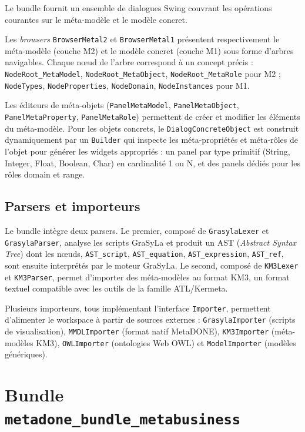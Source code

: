 Le bundle fournit un ensemble de dialogues Swing couvrant les opérations courantes sur le méta-modèle et le modèle concret.

Les \emph{browsers} \texttt{BrowserMetal2} et \texttt{BrowserMetal1} présentent respectivement le méta-modèle (couche M2) et le modèle concret (couche M1) sous forme d'arbres navigables. Chaque nœud de l'arbre correspond à un concept précis : \texttt{NodeRoot\_MetaModel}, \texttt{NodeRoot\_MetaObject}, \texttt{NodeRoot\_MetaRole} pour M2 ; \texttt{NodeTypes}, \texttt{NodeProperties}, \texttt{NodeDomain}, \texttt{NodeInstances} pour M1.

Les éditeurs de méta-objets (\texttt{PanelMetaModel}, \texttt{PanelMetaObject}, \texttt{PanelMetaProperty}, \texttt{PanelMetaRole}) permettent de créer et modifier les éléments du méta-modèle. Pour les objets concrets, le \texttt{DialogConcreteObject} est construit dynamiquement par un \texttt{Builder} qui inspecte les méta-propriétés et méta-rôles de l'objet pour générer les widgets appropriés : un panel par type primitif (String, Integer, Float, Boolean, Char) en cardinalité 1 ou N, et des panels dédiés pour les rôles domain et range.

\subsection{Parsers et importeurs}

Le bundle intègre deux parsers. Le premier, composé de
\texttt{GrasylaLexer} et \texttt{GrasylaParser}, analyse les scripts GraSyLa et produit un AST (\emph{Abstract Syntax Tree}) dont les nœuds, \texttt{AST\_script}, \texttt{AST\_equation}, \texttt{AST\_expression},
\texttt{AST\_ref}, sont ensuite interprétés par le moteur GraSyLa. Le second, composé de \texttt{KM3Lexer} et \texttt{KM3Parser}, permet d'importer des méta-modèles au format KM3, un format textuel compatible avec les outils de la famille ATL/Kermeta.

Plusieurs importeurs, tous implémentant l'interface \texttt{Importer}, permettent d'alimenter le workspace à partir de sources externes : \texttt{GrasylaImporter} (scripts de visualisation), \texttt{MMDLImporter} (format natif MetaDONE), \texttt{KM3Importer} (méta-modèles KM3), \texttt{OWLImporter} (ontologies Web OWL) et \texttt{ModelImporter} (modèles génériques).

\section{Bundle \texttt{metadone\_bundle\_metabusiness}}

